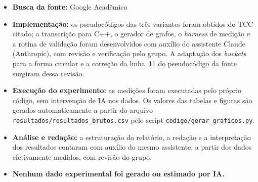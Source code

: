 \documentclass[12pt,a4paper]{article}
\begin{document}
\begin{itemize}
  \item \textbf{Busca da fonte:} Google Acadêmico
  \item \textbf{Implementação:} os pseudocódigos das três variantes foram
        obtidos do TCC citado; a transcrição para C++, o gerador de grafos, o
        \emph{harness} de medição e a rotina de validação foram desenvolvidos
        com auxílio do assistente Claude (Anthropic), com revisão e
        verificação pelo grupo. A adaptação dos \emph{buckets} para a forma
        circular e a correção da linha~11 do pseudocódigo da fonte surgiram
        dessa revisão.
  \item \textbf{Execução do experimento:} as medições foram executadas pelo
        próprio código, sem intervenção de IA nos dados. Os valores das
        tabelas e figuras são gerados automaticamente a partir do arquivo
        \texttt{resultados/resultados\_brutos.csv} pelo script
        \texttt{codigo/gerar\_graficos.py}.
  \item \textbf{Análise e redação:} a estruturação do relatório, a redação e a
        interpretação dos resultados contaram com auxílio do mesmo assistente,
        a partir dos dados efetivamente medidos, com revisão do grupo.
  \item \textbf{Nenhum dado experimental foi gerado ou estimado por IA.}
\end{itemize}

\end{document}
